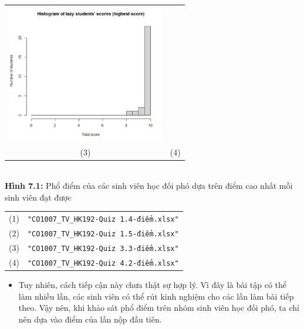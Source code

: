\documentclass[a4paper]{article}
\theoremstyle{definition}
\begin{document}
\begin{enumerate}[a)]
\begin{itemize}
\begin{center}
\begin{tabular}{c c}
                 \includegraphics[width = 6.9cm]{Images/img7-2-4.png} \\
                 (3) & (4)
            \end{tabular}\\
            \textbf{Hình 7.1:} Phổ điểm của các sinh viên học đối phó dựa trên điểm cao nhất mỗi sinh viên đạt được\\
            \begin{tabular}{c c}
                 (1) & \texttt{"CO1007\_TV\_HK192-Quiz 1.4-điểm.xlsx"}\\
                 (2) & \texttt{"CO1007\_TV\_HK192-Quiz 1.5-điểm.xlsx"}\\
                 (3) & \texttt{"CO1007\_TV\_HK192-Quiz 3.3-điểm.xlsx"}\\
                 (4) & \texttt{"CO1007\_TV\_HK192-Quiz 4.2-điểm.xlsx"}
            \end{tabular}
        \end{center}
        \begin{itemize}
            \item Tuy nhiên, cách tiếp cận này chưa thật sự hợp lý. Vì đây là bài tập có thể làm nhiều lần, các sinh viên có thể rút kinh nghiệm cho các lần làm bài tiếp theo. Vậy nên, khi khảo sát phổ điểm trên nhóm sinh viên học đối phó, ta chỉ nên dựa vào điểm của lần nộp đầu tiên.
        \end{itemize}
        \begin{center}
            \begin{tabular}{c c}

\end{tabular}
\end{center}
\end{itemize}
\end{enumerate}
\end{document}
